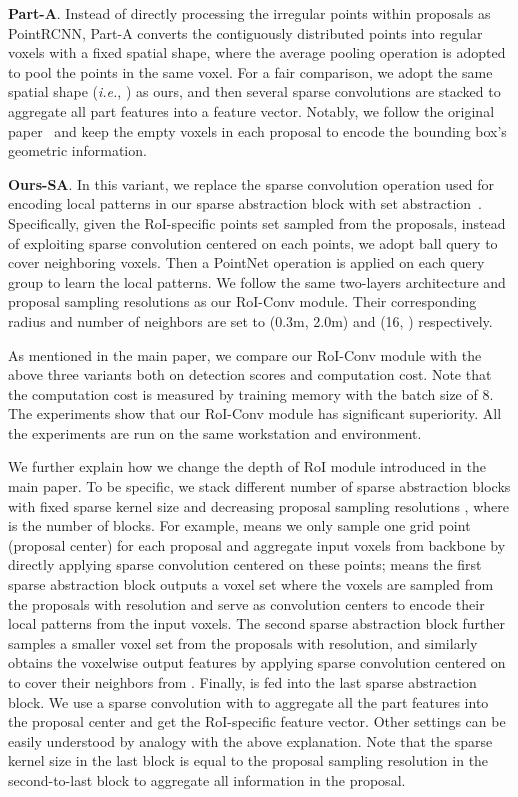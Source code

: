 \documentclass{article}
\begin{document}
\textbf{Part-A}. Instead of directly processing the irregular points within proposals as PointRCNN, Part-A converts the contiguously distributed points into regular voxels with a fixed spatial shape, where the average pooling operation is adopted to pool the points in the same voxel. For a fair comparison, we adopt the same spatial shape (\textit{i.e.}, ) as ours, and then several sparse convolutions are stacked to aggregate all part features into a feature vector. Notably, we follow the original paper~\cite{shi2020p2} and keep the empty voxels in each proposal to encode the bounding box's geometric information.

\textbf{Ours-SA}. In this variant, we replace the sparse convolution operation used for encoding local patterns in our sparse abstraction block with set abstraction~\cite{qi2018pointnnetplus}. Specifically, given the RoI-specific points set  sampled from the proposals, instead of exploiting sparse convolution centered on each points, we adopt ball query to cover neighboring voxels. Then a PointNet operation is applied on each query group to learn the local patterns. We follow the same two-layers architecture and proposal sampling resolutions as our RoI-Conv module.  Their corresponding radius and number of neighbors are set to (0.3m, 2.0m) and (16, ) respectively.  

As mentioned in the main paper, we compare our RoI-Conv module with the above three variants both on detection scores and computation cost. Note that the computation cost is measured by training memory with the batch size of 8. The experiments show that our RoI-Conv module has significant superiority. All the experiments are run on the same workstation and environment.

We further explain how we change the depth of RoI module introduced in the main paper. To be specific, we stack different number of sparse abstraction blocks with fixed sparse kernel size  and decreasing proposal sampling resolutions , where  is the number of blocks. For example,  means we only sample one grid point (proposal center) for each proposal and aggregate input voxels from backbone by directly applying sparse convolution centered on these points;  means the first sparse abstraction block outputs a voxel set  where the voxels are sampled from the proposals with  resolution and serve as convolution centers to encode their local patterns from the input voxels. 
The second sparse abstraction block further samples a smaller voxel set  from the proposals with  resolution, and similarly obtains the voxelwise output features by applying sparse convolution centered on  to cover their neighbors from . Finally,  is fed into the last sparse abstraction block. We use a sparse convolution with  to aggregate all the part features into the proposal center and get the RoI-specific feature vector. Other settings can be easily understood by analogy with the above explanation. Note that the sparse kernel size  in the last block is equal to the proposal sampling resolution in the second-to-last block to aggregate all information in the proposal. 
\end{document}
